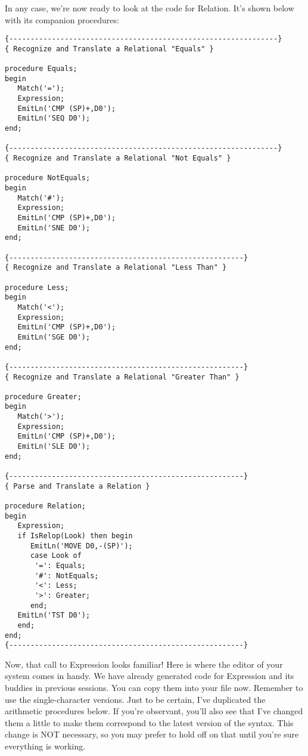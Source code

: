 In  any  case, we're now ready to look at the code for Relation. It's shown below with its companion procedures:

\begin{verbatim}
{---------------------------------------------------------------}
{ Recognize and Translate a Relational "Equals" }

procedure Equals;
begin
   Match('=');
   Expression;
   EmitLn('CMP (SP)+,D0');
   EmitLn('SEQ D0');
end;

{---------------------------------------------------------------}
{ Recognize and Translate a Relational "Not Equals" }

procedure NotEquals;
begin
   Match('#');
   Expression;
   EmitLn('CMP (SP)+,D0');
   EmitLn('SNE D0');
end;

{-------------------------------------------------------}
{ Recognize and Translate a Relational "Less Than" }

procedure Less;
begin
   Match('<');
   Expression;
   EmitLn('CMP (SP)+,D0');
   EmitLn('SGE D0');
end;

{-------------------------------------------------------}
{ Recognize and Translate a Relational "Greater Than" }

procedure Greater;
begin
   Match('>');
   Expression;
   EmitLn('CMP (SP)+,D0');
   EmitLn('SLE D0');
end;

{-------------------------------------------------------}
{ Parse and Translate a Relation }

procedure Relation;
begin
   Expression;
   if IsRelop(Look) then begin
      EmitLn('MOVE D0,-(SP)');
      case Look of
       '=': Equals;
       '#': NotEquals;
       '<': Less;
       '>': Greater;
      end;
   EmitLn('TST D0');
   end;
end;
{-------------------------------------------------------}
\end{verbatim}

Now, that call to  Expression  looks familiar!  Here is where the editor of your system comes in handy. We have  already generated code  for  Expression  and its buddies in previous sessions. You can  copy  them  into your file now. Remember to use the single-character  versions. Just to be  certain, I've  duplicated  the arithmetic procedures below. If  you're  observant, you'll also see that I've changed them a little to make  them  correspond  to the latest version of the syntax. This change is  NOT necessary, so  you  may  prefer  to  hold  off  on  that  until you're  sure everything is working.

